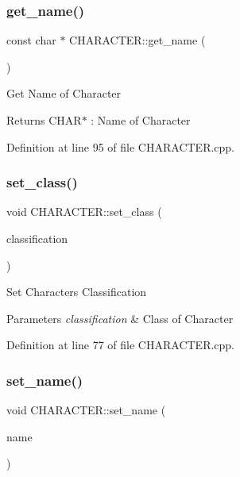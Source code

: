 \subsubsection{\texorpdfstring{get\_name()}{get\_name()}}
{\footnotesize\ttfamily const char $\ast$ C\+H\+A\+R\+A\+C\+T\+E\+R\+::get\+\_\+name (\begin{DoxyParamCaption}{ }\end{DoxyParamCaption})}



Get Name of Character 

\begin{DoxyReturn}{Returns}
C\+H\+A\+R$\ast$ \+: Name of Character
\end{DoxyReturn}


Definition at line 95 of file C\+H\+A\+R\+A\+C\+T\+E\+R.\+cpp.

\mbox{\label{class_c_h_a_r_a_c_t_e_r_a926e6b6d0d3365e82c889c346904bb9f}} 
\subsubsection{\texorpdfstring{set\_class()}{set\_class()}}
{\footnotesize\ttfamily void C\+H\+A\+R\+A\+C\+T\+E\+R\+::set\+\_\+class (\begin{DoxyParamCaption}\item[{const char $\ast$\&}]{classification }\end{DoxyParamCaption})}



Set Character\textquotesingle{}s Classification 


\begin{DoxyParams}{Parameters}
{\em classification} & Class of Character\\
\hline
\end{DoxyParams}


Definition at line 77 of file C\+H\+A\+R\+A\+C\+T\+E\+R.\+cpp.

\mbox{\label{class_c_h_a_r_a_c_t_e_r_aa00c4039fd3fed8620fbf200bfbe2cca}} 
\subsubsection{\texorpdfstring{set\_name()}{set\_name()}}
{\footnotesize\ttfamily void C\+H\+A\+R\+A\+C\+T\+E\+R\+::set\+\_\+name (\begin{DoxyParamCaption}\item[{const char $\ast$\&}]{name }\end{DoxyParamCaption})}



